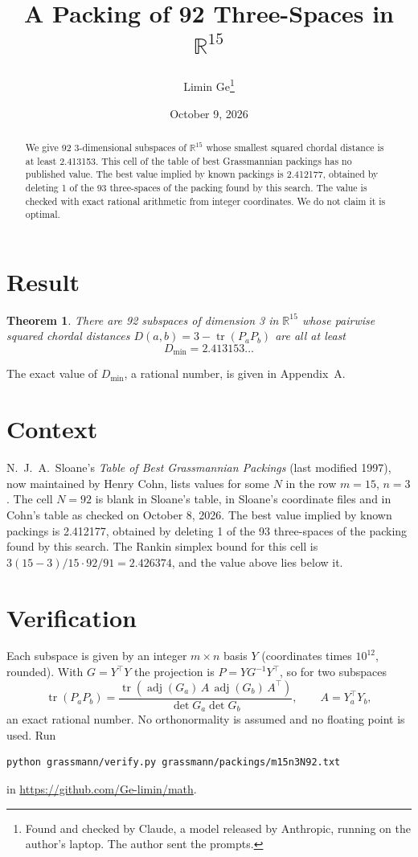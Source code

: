 \documentclass[11pt,a4paper]{article}
\title{A Packing of 92 Three-Spaces in $\mathbb{R}^{15}$}
\author{Limin Ge\thanks{Found and checked by Claude, a model released by Anthropic, running on the author's laptop. The author sent the prompts.}}
\date{October 9, 2026}
\newtheorem*{theorem}{Theorem}
\begin{document}
\maketitle
\begin{abstract}
We give 92 3-dimensional subspaces of $\mathbb{R}^{15}$ whose smallest squared chordal distance is at least 2.413153. This cell of the table of best Grassmannian packings has no published value. The best value implied by known packings is 2.412177, obtained by deleting 1 of the 93 three-spaces of the packing found by this search. The value is checked with exact rational arithmetic from integer coordinates. We do not claim it is optimal.
\end{abstract}

\section{Result}
\begin{theorem}
There are 92 subspaces of dimension 3 in $\mathbb{R}^{15}$ whose pairwise squared chordal distances $D(a,b) = 3 - \operatorname{tr}(P_aP_b)$ are all at least
\[ D_{\min} = 2.413153\ldots \]
\end{theorem}
The exact value of $D_{\min}$, a rational number, is given in Appendix~A.


\section{Context}
N.~J.~A.~Sloane's \emph{Table of Best Grassmannian Packings} (last modified 1997), now maintained by Henry Cohn, lists values for some $N$ in the row $m=15$, $n=3$. The cell $N=92$ is blank in Sloane's table, in Sloane's coordinate files and in Cohn's table as checked on October 8, 2026. The best value implied by known packings is 2.412177, obtained by deleting 1 of the 93 three-spaces of the packing found by this search. The Rankin simplex bound for this cell is $3(15-3)/15\cdot 92/91 = 2.426374$, and the value above lies below it.


\section{Verification}
Each subspace is given by an integer $m\times n$ basis $Y$ (coordinates times $10^{12}$, rounded). With $G=Y^\top Y$ the projection is $P=YG^{-1}Y^\top$, so for two subspaces
\[ \operatorname{tr}(P_aP_b)=\frac{\operatorname{tr}(\operatorname{adj}(G_a)\,A\,\operatorname{adj}(G_b)\,A^\top)}{\det G_a\det G_b},\qquad A=Y_a^\top Y_b, \]
an exact rational number. No orthonormality is assumed and no floating point is used. Run
\begin{verbatim}
python grassmann/verify.py grassmann/packings/m15n3N92.txt
\end{verbatim}
in \url{https://github.com/Ge-limin/math}.
\end{document}
